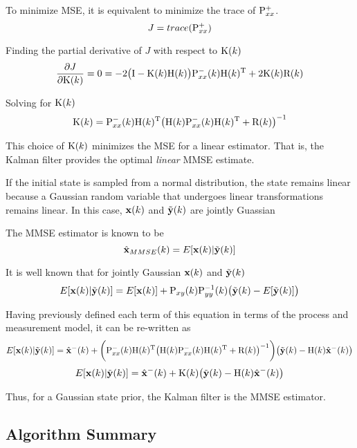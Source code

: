To minimize MSE, it is equivalent to minimize the trace of $\Pxx\post$.
\begin{equation}
J=trace(\Pxx\post)
\end{equation}

Finding the partial derivative of $ J $ with respect to $ \Kk $
\begin{equation}
\frac{\partial J}{\partial \Kk} = 0 = -2\terma \Pxx\prior\k\Hk\trans+2\Kk\Rk
\end{equation}

Solving for $\Kk$
\begin{equation}
\Kk =\Pxx\prior\k\Hk\trans\big(\Hk\Pxx\prior\k\Hk\trans+\Rk\big)^{-1} 
\end{equation}

This choice of $\Kk $ minimizes the MSE for a linear estimator.
That is, the Kalman filter provides the optimal \textit{linear} MMSE estimate.

If the initial state is sampled from a normal distribution, the state remains linear because a Gaussian random variable that undergoes linear transformations remains linear. 
In this case, $\xk$ and $\yktilde$ are jointly Guassian

The MMSE estimator is known to be 
\begin{equation}
\xhat_{MMSE}\k=E[\xk|\yktilde]
\end{equation}

It is well known that for jointly Gaussian $ \xk $ and $ \yktilde $ 
\begin{equation}
E[\xk|\yktilde]=E[\xk]+\Pxy\k\Pyy^{-1}\k\big(\yktilde-E[\yktilde]\big)
\end{equation}

Having previously defined each term of this equation in terms of the process and measurement model, it can be re-written as 
\begin{equation}
E[\xk|\yktilde]=\xprior\k+\bigg(\Pxx\prior\k\Hk\trans\big(\Hk\Pxx\prior\k\Hk\trans+\Rk\big)^{-1}\bigg) \big(\yktilde-\Hk\xprior\k\big)
\end{equation}
\begin{equation}
E[\xk|\yktilde]=\xprior\k+\Kk \big(\yktilde-\Hk\xprior\k\big)
\end{equation}

Thus, for a Gaussian state prior, the Kalman filter is the MMSE estimator. 

\subsection{Algorithm Summary}

